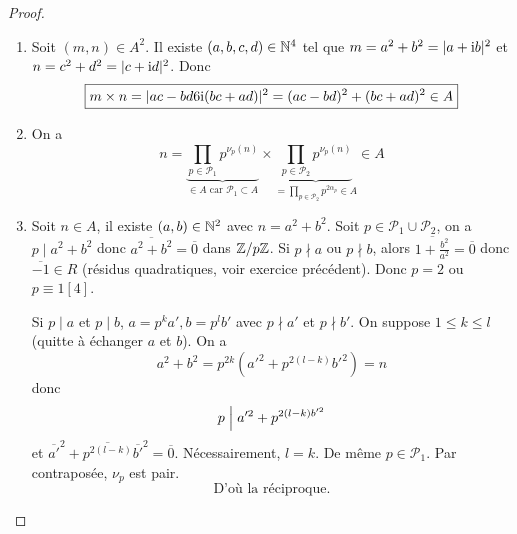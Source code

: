 \begin{proof}
	\phantom{}
	\begin{enumerate}
		\item Soit $(m,n)\in A^{2}$. Il existe $(a,b,c,d)\in\mathbb{N}^{4}$ tel que $m=a^{2}+b^{2}=\vert a+\mathrm{i} b\vert^{2}$ et $n=c^{2}+d^{2}=\vert c+\mathrm{i} d\vert^{2}$. Donc 
		\begin{equation}
			\boxed{m\times n=\vert ac-bd6\mathrm{i}(bc+ad)\vert^{2}=(ac-bd)^{2}+(bc+ad)^{2}\in A}
		\end{equation}
		\item On a 
		\begin{equation}
			\boxed{n=\underbrace{\prod_{p\in\mathcal{P}_{1}}p^{\nu_{p}(n)}}_{\in A\text{ car }\mathcal{P}_{1}\subset A}\times\underbrace{\prod_{p\in\mathcal{P}_{2}}p^{\nu_{p}(n)}}_{=\prod_{p\in\mathcal{P}_{2}}p^{2\alpha_{p}}\in A}\in A}
		\end{equation}

		\item Soit $n\in A$, il existe $(a,b)\in\mathbb{N}^{2}$ avec $n=a^{2}+b^{2}$. Soit $p\in \mathcal{P}_{1}\cup\mathcal{P}_{2}$, on a $p\mid a^{2}+b^{2}$ donc $\overline{a^{2}+b^{2}}=\overline{0}$ dans $\mathbb{Z}/p\mathbb{Z}$. Si $p\nmid a$ ou $p\nmid b$, alors $\overline{1+\frac{b^{2}}{a^{2}}}=\overline{0}$ donc $\overline{-1}\in R$ (résidus quadratiques, voir exercice précédent). Donc $p=2$ ou $p\equiv 1[4]$.
		
		Si $p\mid a$ et $p\mid b$, $a=p^{k}a', b=p^{l}b'$ avec $p\nmid a'$ et $p\nmid b'$. On suppose $1\leqslant k\leqslant l$ (quitte à échanger $a$ et $b$).
		On a 
		\begin{equation}
			a^{2}+b^{2}=p^{2k}(a'^{2}+p^{2(l-k)}b'^{2})=n
		\end{equation}
		donc 
		\begin{equation}
			p\Bigm| a'^{2}+p^{2(l-k)b'^{2}}
		\end{equation}
		et $\overline{a'}^{2}+\overline{p^{2(l-k)}}\overline{b'}^{2}=\overline{0}$. Nécessairement, $l=k$. De même $p\in\mathcal{P}_{1}$. Par contraposée, $\nu_{p}$ est pair.
		\begin{equation}
			\boxed{\text{D'où la réciproque.}}
		\end{equation}
	\end{enumerate}
\end{proof}